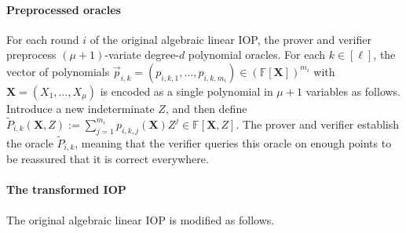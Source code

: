 \paragraph{Preprocessed oracles} 
For each round $i$ of the original algebraic linear IOP, the prover and verifier preprocess $(\mu+1)$-variate degree-$d$ polynomial oracles. %
For each $k \in [\ell]$, the vector of polynomials $\vec{p}_{i,k} = (p_{i,k,1},\ldots,p_{i,k, m_i}) \in (\mathbb{F}[\mathbf{X}])^{m_i}$ with $\mathbf{X} = (X_1,\ldots,X_\mu)$ is encoded as a single polynomial in $\mu + 1$ variables as follows. Introduce a new indeterminate $Z$, and then define $\tilde{P}_{i,k}(\mathbf{X}, Z) := \sum_{j=1}^{m_i} p_{i,k,j}(\mathbf{X}) Z^j \in \mathbb{F}[\mathbf{X},Z]$.
The prover and verifier establish the oracle $\tilde{P}_{i,k}$, meaning that the verifier queries this oracle on enough points to be reassured that it is correct everywhere.

\paragraph{The transformed IOP} 
The original algebraic linear IOP is modified as follows. 

